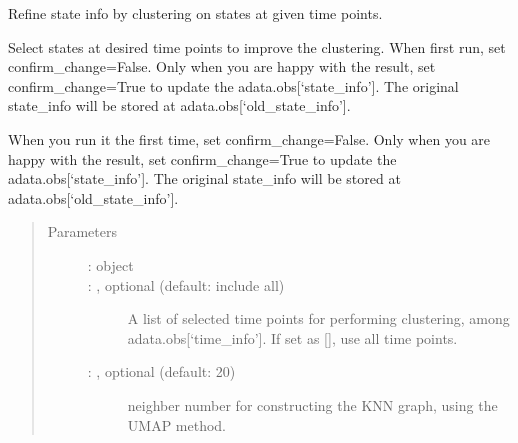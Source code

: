 \documentclass[letterpaper,10pt,english]{sphinxmanual}
\begin{document}
\begin{fulllineitems}
\label{\detokenize{cospar.pp.refine_state_info_by_leiden_clustering:cospar.pp.refine_state_info_by_leiden_clustering}}
Refine state info by clustering on states at given time points.

Select states at desired time points to improve the clustering. When
first run, set confirm\_change=False. Only when you are happy with the
result, set confirm\_change=True to update the adata.obs{[}‘state\_info’{]}.
The original state\_info will be stored at adata.obs{[}‘old\_state\_info’{]}.

When you run it the first time, set confirm\_change=False. Only when you are happy with
the result, set confirm\_change=True to update the adata.obs{[}‘state\_info’{]}.
The original state\_info will be stored at adata.obs{[}‘old\_state\_info’{]}.
\begin{quote}\begin{description}
\item[{Parameters}] \leavevmode\begin{description}
\item[{ :  object}] \leavevmode


\item[{ : , optional (default: include all)}] \leavevmode
A list of selected time points for performing clustering,
among adata.obs{[}‘time\_info’{]}. If set as {[}{]}, use all time points.

\item[{}] \leavevmode


\item[{ : , optional (default: 20)}] \leavevmode
neighber number for constructing the KNN graph, using the UMAP method.


\end{description}
\end{description}
\end{quote}
\end{fulllineitems}
\end{document}
